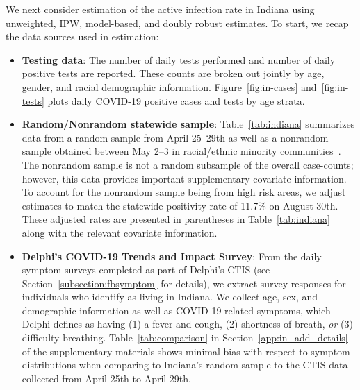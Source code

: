 \documentclass[11pt]{amsart}
\numberwithin{equation}{section}
\theoremstyle{plain}
\begin{document}
 We next consider estimation of the active infection rate in Indiana using unweighted, IPW, model-based, and doubly robust estimates. To start, we recap the data sources used in estimation:
 \begin{itemize}[leftmargin=*]
 \item {\bf Testing data}:  The number of daily tests performed and number of daily positive tests are reported.  These counts are broken out jointly by age, gender, and racial demographic information.  Figure~\ref{fig:in-cases} and~\ref{fig:in-tests} plots daily COVID-19 positive cases and tests by age strata.

 \item {\bf Random/Nonrandom statewide sample}: Table~\ref{tab:indiana} summarizes data from a random sample from April 25--29th as well as a nonrandom sample obtained between May 2--3 in racial/ethnic minority communities~\citep{Yiannoutsos2021}. The nonrandom sample is not a random subsample of the overall case-counts; however, this data provides important supplementary covariate information.
 To account for the nonrandom sample being from high risk areas, we adjust estimates to match the statewide positivity rate of 11.7\% on August 30th. These adjusted rates are presented in parentheses in Table~\ref{tab:indiana} along with the relevant covariate information.

 \item {\bf Delphi's COVID-19 Trends and Impact Survey}: From the daily symptom surveys completed as part of Delphi's CTIS (see Section~\ref{subsection:fbsymptom} for details), we extract survey responses for individuals who identify as living in Indiana.  We collect age, sex, and demographic information as well as COVID-19 related symptoms, which Delphi defines as having (1) a fever and cough, (2) shortness of breath, \emph{or} (3) difficulty breathing. Table~\ref{tab:comparison} in Section~\ref{app:in_add_details} of the supplementary materials shows minimal bias with respect to symptom distributions when comparing to Indiana's random sample to the CTIS data collected from April 25th to April 29th.



\end{itemize}
\end{document}
